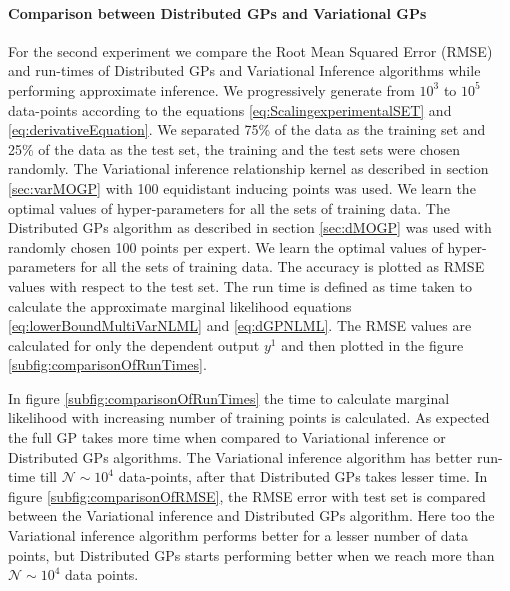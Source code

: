 \paragraph{\textbf{Comparison between Distributed GPs and Variational GPs}}
For the second experiment we compare the Root Mean Squared Error (RMSE) and run-times of Distributed GPs and Variational Inference algorithms while performing approximate inference. We progressively generate from $10^3$ to $10^5$ data-points according to the equations \ref{eq:ScalingexperimentalSET} and \ref{eq:derivativeEquation}. We separated 75\% of the data as the training set and 25\% of the data as the test set, the training and the test sets were chosen randomly. The Variational inference relationship kernel as described in section \ref{sec:varMOGP} with 100 equidistant inducing points was used. We learn the optimal values of hyper-parameters for all the sets of training data. The Distributed GPs algorithm as described in section \ref{sec:dMOGP} was used with randomly chosen 100 points per expert. We learn the optimal values of hyper-parameters for all the sets of training data. The accuracy is plotted as RMSE values with respect to the test set. The run time is defined as time taken to calculate the approximate marginal likelihood equations \ref{eq:lowerBoundMultiVarNLML} and  \ref{eq:dGPNLML}. The RMSE values are calculated for only the dependent output \(y^{1}\) and then plotted in the figure \ref{subfig:comparisonOfRunTimes}. 

In figure \ref{subfig:comparisonOfRunTimes} the time to calculate marginal likelihood with increasing number of training points is calculated. As expected the full GP takes more time when compared to Variational inference or Distributed GPs algorithms. The Variational inference algorithm has better run-time till $\mathcal{N} \sim 10^4$ data-points, after that Distributed GPs takes lesser time. In figure \ref{subfig:comparisonOfRMSE}, the RMSE error with test set is compared between the Variational inference and Distributed GPs algorithm. Here too the Variational inference algorithm performs better for a lesser number of data points, but Distributed GPs starts performing better when we reach more than $\mathcal{N} \sim 10^4$ data points. 

